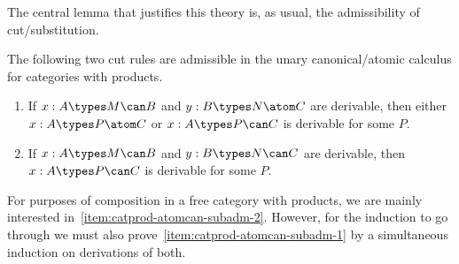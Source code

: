 The central lemma that justifies this theory is, as usual, the admissibility of cut/substitution.

\begin{lem}\label{thm:catprod-atomcan-subadm}
  The following two cut rules are admissible in the unary canonical/atomic calculus for categories with products.
  \begin{enumerate}
  \item If $x:A\types M\can B$ and $y:B\types N\atom C$ are derivable, then either $x:A\types P\atom C$ or $x:A\types P\can C$ is derivable for some $P$.\label{item:catprod-atomcan-subadm-1}
  \item If $x:A\types M\can B$ and $y:B\types N\can C$ are derivable, then $x:A\types P\can C$ is derivable for some $P$.\label{item:catprod-atomcan-subadm-2}
  \end{enumerate}
\end{lem}
For purposes of composition in a free category with products, we are mainly interested in~\ref{item:catprod-atomcan-subadm-2}.
However, for the induction to go through we must also prove~\ref{item:catprod-atomcan-subadm-1} by a simultaneous induction on derivations of both.
